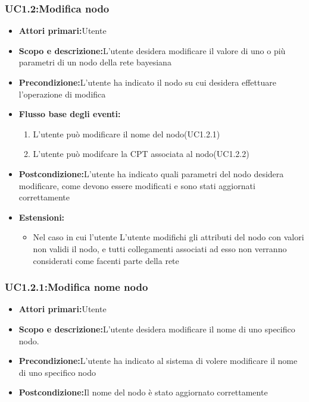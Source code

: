 \subsubsection{UC1.2:Modifica nodo}
\begin{itemize}
	\item{\textbf{Attori primari:}Utente}
	\item{\textbf{Scopo e descrizione:}L'utente desidera modificare il valore di uno o più parametri di un nodo della rete bayesiana}
	\item{\textbf{Precondizione:}L'utente ha indicato il nodo su cui desidera effettuare l'operazione di modifica}
	\item{\textbf{Flusso base degli eventi:}}
		\begin{enumerate}
			\item{L'utente può modificare il nome del nodo(UC1.2.1)}
			\item{L'utente può modifcare la CPT associata al nodo(UC1.2.2)}		
		\end{enumerate}
	\item{\textbf{Postcondizione:}L'utente ha indicato quali parametri del nodo desidera modificare, come devono essere modificati e sono stati aggiornati correttamente}
	\item{\textbf{Estensioni:}}
		\begin{itemize}
			\item{Nel caso in cui l'utente L'utente modifichi gli attributi del nodo con valori non validi il nodo, e tutti collegamenti associati ad esso non verranno considerati come facenti parte della rete}
		\end{itemize}
\end{itemize}
\subsubsection{UC1.2.1:Modifica nome nodo}
\begin{itemize}
	\item{\textbf{Attori primari:}Utente}
	\item{\textbf{Scopo e descrizione:}L'utente desidera modificare il nome di uno specifico nodo.}
	\item{\textbf{Precondizione:}L'utente ha indicato al sistema di volere modificare il nome di uno specifico nodo}
	\item{\textbf{Postcondizione:}Il nome del nodo è stato aggiornato correttamente}
\end{itemize}
